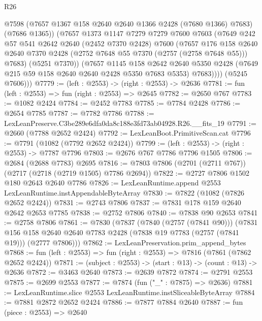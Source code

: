 \begin{lexlean}{R26}
\begin{coremodule}
              @7598
              (@7657 @1367 @158 @2640 @2640 @1366 @2428 (@7680 @1366) @7683)
              (@7686 @1365))
            (@7657
              @1373
              @1147
              @7279
              @7279
              @7600
              @7603
              (@7649
                @242
                @57
                @541
                @2642
                @2640
                (@2452 @7370 @2428)
                @7600
                (@7657
                  @176
                  @158
                  @2640
                  @2640
                  @7370
                  @2428
                  (@2752 @7648 @55 @7370 (@2757 (@2758 @7648 @55)))
                  @7683)
                (@5251 @7370))
              (@7657
                @1145
                @158
                @2642
                @2640
                @5350
                @2428
                (@7649 @215 @59 @158 @2640 @2640 @2428 @5350 @7683 @5353)
                @7683))))
        (@5245 @7606)))
@7779 := (left : @2553) -> (right : @2553) -> @2636
@7781 := fun (left : @2553) => fun (right : @2553) => @2645
@7782 := @2650 @767
@7783 := @1082 @2424
@7784 := @2452 @7783
@7785 := @7784 @2428
@7786 := @2654 @7785
@7787 := @7782 @7786
@7788 := LexLeanPreserve.C3be289e6dfa0da8c188e3fd73ab04928.R26.__fits_19
@7791 := @2660 (@7788 @2652 @2424)
@7792 := LexLeanBoot.PrimitiveScan.cat
@7796 := @7791 (@1082 (@7792 @2652 @2424))
@7799 := (left : @2553) -> (right : @2553) -> @7787 @7796
@7803 := @2676 @767 @7786 @7796 @1505
@7806 := @2684 (@2688 @7783) @2695
@7816 := @7803 @7806 (@2701 (@2711 @767)) (@2717 (@2718 (@2719 @1505) @7786 @2694))
@7822 := @2727 @7806 @1502 @180 @2643 @2640 @7786
@7826 := LexLeanRuntime.append @2553 LexLeanRuntime.instAppendableByteArray
@7830 := @7822 (@1082 (@7826 @2652 @2424))
@7831 := @2743 @7806
@7837 := @7831 @178 @159 @2640 @2642 @2653 @7785
@7838 := @2752 @7806
@7840 := @7838 @90 @2653
@7841 := @2758 @7806
@7861 := @7830
    (@7837
      (@7840 (@2757 (@7841 @90)))
      (@7831 @156 @158 @2640 @2640 @7783 @2428 (@7838 @19 @7783 (@2757 (@7841 @19))) (@2777 @7806)))
@7862 := LexLeanPreservation.prim_append_bytes
@7868 := fun (left : @2553) => fun (right : @2553) => @7816 (@7861 (@7862 @2652 @2424))
@7871 := (subject : @2553) -> (start : @13) -> (count : @13) -> @2636
@7872 := @3463 @2640
@7873 := @2639 @7872
@7874 := @2791 @2553
@7875 := @2699 @2553
@7877 := @7874 (fun ("_" : @7875) => @2636)
@7881 := LexLeanRuntime.slice @2553 LexLeanRuntime.instSliceableByteArray
@7884 := @7881 @2872 @2652 @2424
@7886 := @7877 @7884 @2640
@7887 := fun (piece : @2553) => @2640

\end{coremodule}
\end{lexlean}
